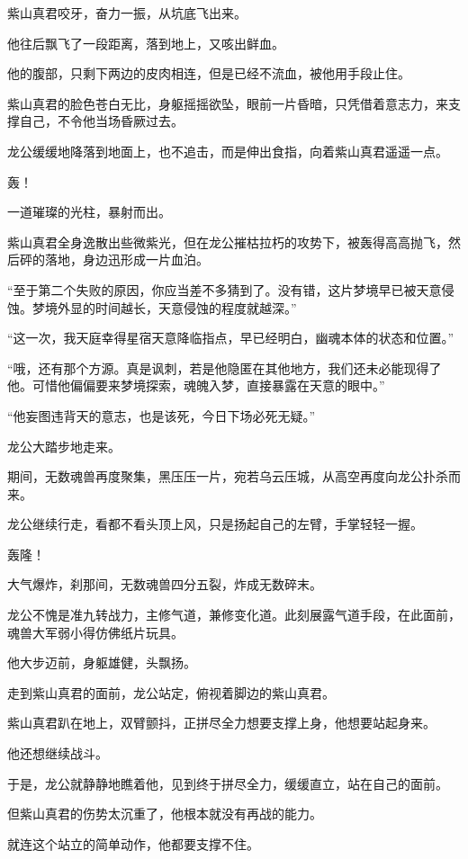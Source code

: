 \begin{this_body}
紫山真君咬牙，奋力一振，从坑底飞出来。

他往后飘飞了一段距离，落到地上，又咳出鲜血。

他的腹部，只剩下两边的皮肉相连，但是已经不流血，被他用手段止住。

紫山真君的脸色苍白无比，身躯摇摇欲坠，眼前一片昏暗，只凭借着意志力，来支撑自己，不令他当场昏厥过去。

龙公缓缓地降落到地面上，也不追击，而是伸出食指，向着紫山真君遥遥一点。

轰！

一道璀璨的光柱，暴射而出。

紫山真君全身逸散出些微紫光，但在龙公摧枯拉朽的攻势下，被轰得高高抛飞，然后砰的落地，身边迅形成一片血泊。

“至于第二个失败的原因，你应当差不多猜到了。没有错，这片梦境早已被天意侵蚀。梦境外显的时间越长，天意侵蚀的程度就越深。”

“这一次，我天庭幸得星宿天意降临指点，早已经明白，幽魂本体的状态和位置。”

“哦，还有那个方源。真是讽刺，若是他隐匿在其他地方，我们还未必能现得了他。可惜他偏偏要来梦境探索，魂魄入梦，直接暴露在天意的眼中。”

“他妄图违背天的意志，也是该死，今日下场必死无疑。”

龙公大踏步地走来。

期间，无数魂兽再度聚集，黑压压一片，宛若乌云压城，从高空再度向龙公扑杀而来。

龙公继续行走，看都不看头顶上风，只是扬起自己的左臂，手掌轻轻一握。

轰隆！

大气爆炸，刹那间，无数魂兽四分五裂，炸成无数碎末。

龙公不愧是准九转战力，主修气道，兼修变化道。此刻展露气道手段，在此面前，魂兽大军弱小得仿佛纸片玩具。

他大步迈前，身躯雄健，头飘扬。

走到紫山真君的面前，龙公站定，俯视着脚边的紫山真君。

紫山真君趴在地上，双臂颤抖，正拼尽全力想要支撑上身，他想要站起身来。

他还想继续战斗。

于是，龙公就静静地瞧着他，见到终于拼尽全力，缓缓直立，站在自己的面前。

但紫山真君的伤势太沉重了，他根本就没有再战的能力。

就连这个站立的简单动作，他都要支撑不住。


\end{this_body}
